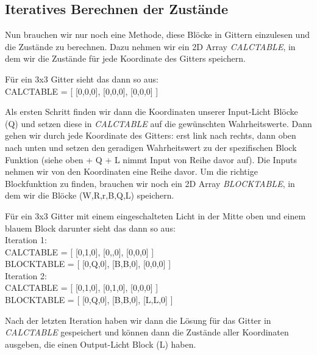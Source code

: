 \documentclass[a4paper,10pt,ngerman]{scrartcl}
\begin{document}
\subsection{Iteratives Berechnen der Zustände}
Nun brauchen wir nur noch eine Methode, diese Blöcke in Gittern einzulesen und die Zustände zu berechnen.
Dazu nehmen wir ein 2D Array \emph{CALC\textunderscore TABLE}, in dem wir die Zustände für jede Koordinate des Gitters speichern.\\
\begin{examplei}
Für ein 3x3 Gitter sieht das dann so aus:\\
CALC\textunderscore TABLE = [ [0,0,0], [0,0,0], [0,0,0] ]
\end{examplei}
Als ersten Schritt finden wir dann die Koordinaten unserer Input-Licht Blöcke (Q) und setzen diese in \emph{CALC\textunderscore TABLE} auf die gewünschten Wahrheitswerte.
Dann gehen wir durch jede Koordinate des Gitters: erst link nach rechts, dann oben nach unten und setzen den geradigen Wahrheitswert zu der spezifischen Block Funktion (siehe oben + Q + L nimmt Input von Reihe davor auf). Die Inputs nehmen wir von den Koordinaten eine Reihe davor. 
Um die richtige Blockfunktion zu finden, brauchen wir noch ein 2D Array \emph{BLOCK\textunderscore TABLE}, in dem wir die Blöcke (W,R,r,B,Q,L) speichern.\\
\begin{examplei}
Für ein 3x3 Gitter mit einem eingeschalteten Licht in der Mitte oben und einem blauem Block darunter sieht das dann so aus:\\
Iteration 1:\\
CALC\textunderscore TABLE = [ [0,1,0], [0,,0], [0,0,0] ]\\
BLOCK\textunderscore TABLE = [ [0,Q,0], [B,B,0], [0,0,0] ]\\
Iteration 2:\\
CALC\textunderscore TABLE = [ [0,1,0], [0,1,0], [0,0,0] ]\\
BLOCK\textunderscore TABLE = [ [0,Q,0], [B,B,0], [L,L,0] ]\\
\end{examplei}
Nach der letzten Iteration haben wir dann die Lösung für das Gitter in \emph{CALC\textunderscore TABLE} gespeichert und können dann die Zustände aller Koordinaten ausgeben, die einen Output-Licht Block (L) haben.\\



\clearpage
\end{document}
